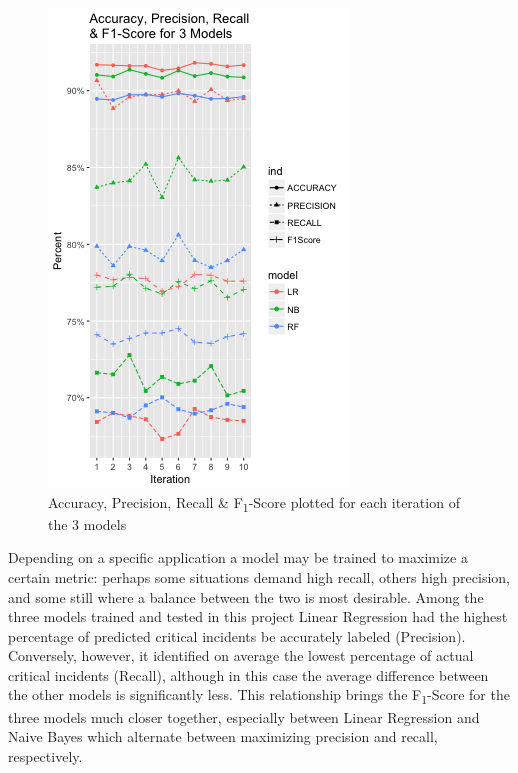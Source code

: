 \documentclass[12pt,letterpaper, oneside]
{article}
\begin{document}
\begin{figure}
	\centering
		\includegraphics[width=\textwidth]{accuracy_precision_recall_3models}
		\caption{Accuracy, Precision, Recall \& F\textsubscript{1}-Score plotted for each iteration of the 3 models
			\label{fig:eval-3models}
		}
\end{figure}

Depending on a specific application a model may be trained to maximize a certain metric: perhaps some situations demand high recall, others high precision, and some still where a balance between the two is most desirable. Among the three models trained and tested in this project Linear Regression had the highest percentage of predicted critical incidents be accurately labeled (Precision). Conversely, however, it identified on average the lowest percentage of actual critical incidents (Recall), although in this case the average difference between the other models is significantly less. This relationship brings the F\textsubscript{1}-Score for the three models much closer together, especially between Linear Regression and Naive Bayes which alternate between maximizing precision and recall, respectively. 
\end{document}
